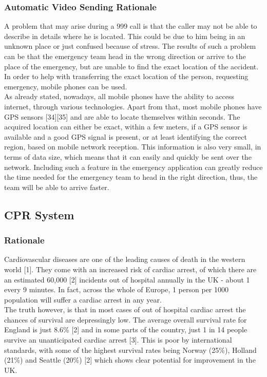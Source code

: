 \documentclass{article}
\begin{document}
	\subsubsection{Automatic Video Sending Rationale}
	A problem that may arise during a 999 call is that the caller may not be able to describe in details where he is located. This could be due to him being in an unknown place or just confused because of stress. The results of such a problem can be that the emergency team head in the wrong direction or arrive to the place of the emergency, but are unable to find the exact location of the accident. In order to help with transferring the exact location of the person, requesting emergency, mobile phones can be used.\\

As already stated, nowadays, all mobile phones have the ability to access internet, through various technologies. Apart from that, most mobile phones have GPS sensors [34][35] and are able to locate themselves within seconds. The acquired location can either be exact, within a few meters, if a GPS sensor is available and a good GPS signal is present, or at least identifying the correct region, based on mobile network reception. This information is also very small, in terms of data size, which means that it can easily and quickly be sent over the network. Including such a feature in the emergency application can greatly reduce the time needed for the emergency team to head in the right direction, thus, the team will be able to arrive faster.\\
    	
    	
    \subsection{CPR System}
    	\subsubsection{Rationale}
    	Cardiovascular diseases are one of the leading causes of death in the western world [1]. They come with an increased risk of cardiac arrest, of which there are an estimated 60,000 [2] incidents out of hospital annually in the UK - about 1 every 9 minutes. In fact, across the whole of Europe, 1 person per 1000 population will suffer a cardiac arrest in any year.\\
    	
The truth however, is that in most cases of out of hospital cardiac arrest the chances of survival are depressingly low. The average overall survival rate for England is just 8.6\% [2] and in some parts of the country, just 1 in 14 people survive an unanticipated cardiac arrest [3]. This is poor by international standards, with some of the highest survival rates being Norway (25\%), Holland (21\%) and Seattle (20\%) [2] which shows clear potential for improvement in the UK.\\
\end{document}
